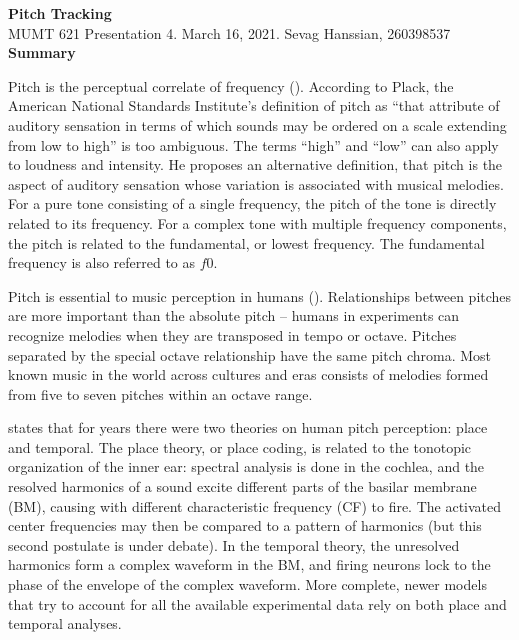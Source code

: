 \documentclass[letter,11pt]{report}
\begin{document}
\noindent\LARGE{\textbf{Pitch Tracking}}\\
\Large{MUMT 621 Presentation 4. March 16, 2021. Sevag Hanssian, 260398537}\\

\noindent\Large{\textbf{Summary}}

Pitch is the perceptual correlate of frequency (\cite{plack}). According to Plack, the American National Standards Institute's definition of pitch as ``that attribute of auditory sensation in terms of which sounds may be ordered on a scale extending from low to high'' is too ambiguous. The terms ``high'' and ``low'' can also apply to loudness and intensity. He proposes an alternative definition, that pitch is the aspect of auditory sensation whose variation is associated with musical melodies. For a pure tone consisting of a single frequency, the pitch of the tone is directly related to its frequency. For a complex tone with multiple frequency components, the pitch is related to the fundamental, or lowest frequency. The fundamental frequency is also referred to as $\mathit{f0}$.

Pitch is essential to music perception in humans (\cite{musicevo}). Relationships between pitches are more important than the absolute pitch -- humans in experiments can recognize melodies when they are transposed in tempo or octave. Pitches separated by the special octave relationship have the same pitch chroma. Most known music in the world across cultures and eras consists of melodies formed from five to seven pitches within an octave range.

\textcite{moore} states that for years there were two theories on human pitch perception: place and temporal. The place theory, or place coding, is related to the tonotopic organization of the inner ear: spectral analysis is done in the cochlea, and the resolved harmonics of a sound excite different parts of the basilar membrane (BM), causing with different characteristic frequency (CF) to fire. The activated center frequencies may then be compared to a pattern of harmonics (but this second postulate is under debate). In the temporal theory, the unresolved harmonics form a complex waveform in the BM, and firing neurons lock to the phase of the envelope of the complex waveform. More complete, newer models that try to account for all the available experimental data rely on both place and temporal analyses.
\end{document}
